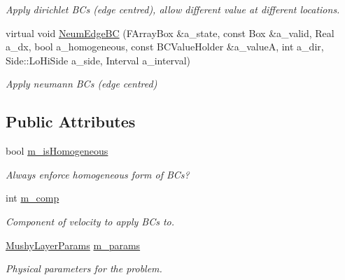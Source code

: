 \begin{DoxyCompactItemize}
\begin{DoxyCompactList}\small\item\em Apply dirichlet B\-Cs (edge centred), allow different value at different locations. \end{DoxyCompactList}\item 
\hypertarget{class_abstract_face_b_c_function_a02f477a3ea7e1f91fa88815dadb1d9e9}{virtual void \hyperlink{class_abstract_face_b_c_function_a02f477a3ea7e1f91fa88815dadb1d9e9}{Neum\-Edge\-B\-C} (F\-Array\-Box \&a\-\_\-state, const Box \&a\-\_\-valid, Real a\-\_\-dx, bool a\-\_\-homogeneous, const B\-C\-Value\-Holder \&a\-\_\-value\-A, int a\-\_\-dir, Side\-::\-Lo\-Hi\-Side a\-\_\-side, Interval a\-\_\-interval)}\label{class_abstract_face_b_c_function_a02f477a3ea7e1f91fa88815dadb1d9e9}

\begin{DoxyCompactList}\small\item\em Apply neumann B\-Cs (edge centred) \end{DoxyCompactList}\end{DoxyCompactItemize}
\subsection*{Public Attributes}
\begin{DoxyCompactItemize}
\item 
\hypertarget{class_abstract_face_b_c_function_a68fdad0aa96f41e116e78f7488c9f747}{bool \hyperlink{class_abstract_face_b_c_function_a68fdad0aa96f41e116e78f7488c9f747}{m\-\_\-is\-Homogeneous}}\label{class_abstract_face_b_c_function_a68fdad0aa96f41e116e78f7488c9f747}

\begin{DoxyCompactList}\small\item\em Always enforce homogeneous form of B\-Cs? \end{DoxyCompactList}\item 
\hypertarget{class_abstract_face_b_c_function_ac626713cfdda3f62b9cece48abe03f2e}{int \hyperlink{class_abstract_face_b_c_function_ac626713cfdda3f62b9cece48abe03f2e}{m\-\_\-comp}}\label{class_abstract_face_b_c_function_ac626713cfdda3f62b9cece48abe03f2e}

\begin{DoxyCompactList}\small\item\em Component of velocity to apply B\-Cs to. \end{DoxyCompactList}\item 
\hypertarget{class_abstract_face_b_c_function_afe26ef4a7478bd64803699643d3dc11f}{\hyperlink{class_mushy_layer_params}{Mushy\-Layer\-Params} \hyperlink{class_abstract_face_b_c_function_afe26ef4a7478bd64803699643d3dc11f}{m\-\_\-params}}\label{class_abstract_face_b_c_function_afe26ef4a7478bd64803699643d3dc11f}

\begin{DoxyCompactList}\small\item\em Physical parameters for the problem. \end{DoxyCompactList}\end{DoxyCompactItemize}


